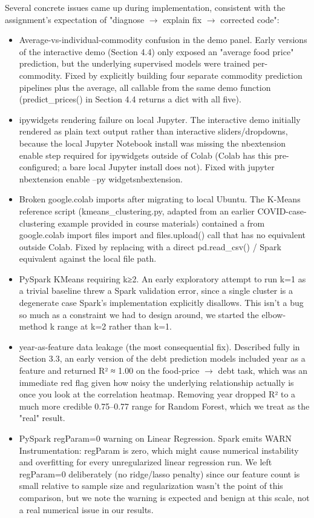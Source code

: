 \documentclass[12pt,a4paper]{article}
\begin{document}
Several concrete issues came up during implementation, consistent with the assignment's expectation of "diagnose $\rightarrow$ explain fix $\rightarrow$ corrected code":
\begin{itemize}[leftmargin=2em]
  \item Average-vs-individual-commodity confusion in the demo panel. Early versions of the interactive demo (Section 4.4) only exposed an "average food price" prediction, but the underlying supervised models were trained per-commodity. Fixed by explicitly building four separate commodity prediction pipelines plus the average, all callable from the same demo function (predict_prices() in Section 4.4 returns a dict with all five).
  \item ipywidgets rendering failure on local Jupyter. The interactive demo initially rendered as plain text output rather than interactive sliders/dropdowns, because the local Jupyter Notebook install was missing the nbextension enable step required for ipywidgets outside of Colab (Colab has this pre-configured; a bare local Jupyter install does not). Fixed with jupyter nbextension enable --py widgetsnbextension.
  \item Broken google.colab imports after migrating to local Ubuntu. The K-Means reference script (kmeans_clustering.py, adapted from an earlier COVID-case-clustering example provided in course materials) contained a from google.colab import files import and files.upload() call that has no equivalent outside Colab. Fixed by replacing with a direct pd.read_csv() / Spark equivalent against the local file path.
  \item PySpark KMeans requiring k≥2. An early exploratory attempt to run k=1 as a trivial baseline threw a Spark validation error, since a single cluster is a degenerate case Spark's implementation explicitly disallows. This isn't a bug so much as a constraint we had to design around, we started the elbow-method k range at k=2 rather than k=1.
  \item year-as-feature data leakage (the most consequential fix). Described fully in Section 3.3, an early version of the debt prediction models included year as a feature and returned R² ≈ 1.00 on the food-price $\rightarrow$ debt task, which was an immediate red flag given how noisy the underlying relationship actually is once you look at the correlation heatmap. Removing year dropped R² to a much more credible 0.75–0.77 range for Random Forest, which we treat as the "real" result.
  \item PySpark regParam=0 warning on Linear Regression. Spark emits WARN Instrumentation: regParam is zero, which might cause numerical instability and overfitting for every unregularized linear regression run. We left regParam=0 deliberately (no ridge/lasso penalty) since our feature count is small relative to sample size and regularization wasn't the point of this comparison, but we note the warning is expected and benign at this scale, not a real numerical issue in our results.
\end{itemize}
\end{document}
